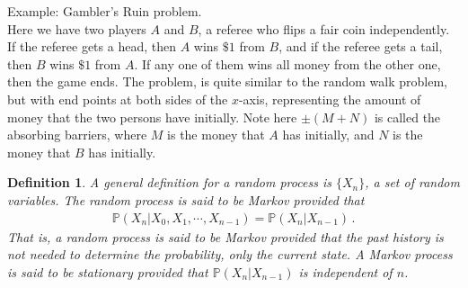 \documentclass[11pt, onesided]{book}
\theoremstyle{break}
\theoremstyle{break}
\newtheorem{defn}{Definition}[thm]
\newcommand{\example}{\color{green}Example: \color{black}}
\begin{document}
\example Gambler's Ruin problem.\\
Here we have two players $A$ and $B$, a referee who flips a fair coin independently. If the referee gets a head, then $A$ wins $\$1$ from $B$, and if the referee gets a tail, then $B$ wins $\$1$ from $A$. If any one of them wins all money from the other one, then the game ends. The problem, is quite similar to the random walk problem, but with end points at both sides of the $x$-axis, representing the amount of money that the two persons have initially. Note here $ \pm(M+N)$ is called the absorbing barriers, where $M$ is the money that $A$ has initially, and $N$ is the money that $B$ has initially. 


\begin{defn}
A general definition for a random process is $\{X_n\}$, a set of random variables. The random process is said to be Markov provided that
\begin{align*}
\mathbb{P}(X_n | X_0,X_1,\cdots, X_{n-1}) = \mathbb{P}(X_n | X_{n-1})\,.
\end{align*}
That is, a random process is said to be Markov provided that the past history is not needed to determine the probability, only the current state. A Markov process is said to be stationary provided that $\mathbb{P}(X_n | X_{n-1})$ is independent of $n$. 
\end{defn}
\end{document}
